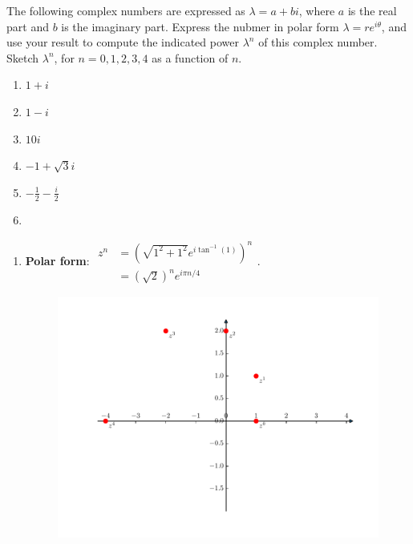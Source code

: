 \begin{homeworkProblem}
    The following complex numbers are expressed as $\lambda=a+bi$, where $a$ is the
    real part and $b$ is the imaginary part. Express the nubmer in polar form
    $\lambda = re^{i\theta}$, and use your result to compute the indicated power
    $\lambda^n$ of this complex number. Sketch $\lambda^n$, for $n = 0, 1, 2, 3, 4$
    as a function of $n$.
    \begin{multicols}{2}
        \begin{enumerate}
            \item $1+i$
            \item $1-i$
            \item $10i$
            \item $-1+\sqrt{3}i$
            \item $-\frac{1}{2} - \frac{i}{2}$
            \item[\vspace{\fill}] %
        \end{enumerate}
    \end{multicols}
    
    \segline
    
    \solution
    
    \begin{multicols}{2}
    \begin{enumerate}
    
    \item \textbf{Polar form}:
    $\begin{aligned}
        z^n &= (\sqrt{1^2 + 1^2} e^{i\tan^{-1}(1)})^n\\ &= (\sqrt{2})^n e^{i\pi n/4}
    \end{aligned}$.
    \begin{figure}[H]
        \centering
        \includegraphics[scale=0.5]{fig/fig8(a).pdf}
    \end{figure}
    

\end{enumerate}
\end{multicols}
\end{homeworkProblem}
